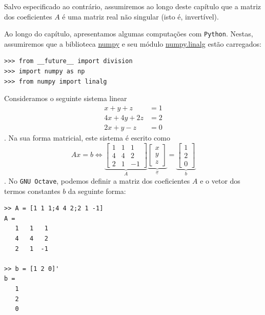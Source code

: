 Salvo especificado ao contrário, assumiremos ao longo deste capítulo que a matriz dos coeficientes $A$ é uma matriz real não singular (isto é, invertível).

\ifispython
Ao longo do capítulo, apresentamos algumas computações com \verb+Python+. Nestas, assumiremos que a biblioteca \href{http://www.numpy.org/}{numpy} e seu módulo \href{https://docs.scipy.org/doc/numpy/reference/routines.linalg.html}{numpy.linalg} estão carregados:
\begin{verbatim}
>>> from __future__ import division
>>> import numpy as np
>>> from numpy import linalg
\end{verbatim}
\fi

\begin{ex}
  Consideramos o seguinte sistema linear
  \begin{equation}
    \begin{split}
      x+y+z  &= 1\\
      4x+4y+2z&= 2\\
      2x+y-z &= 0
    \end{split}
  \end{equation}.
Na sua forma matricial, este sistema é escrito como
\begin{equation}
  Ax = b \Leftrightarrow
  \underbrace{\begin{bmatrix}
    1 & 1 & 1\\
    4 & 4 & 2\\
    2 & 1 & -1
  \end{bmatrix}}_{A}
\underbrace{
  \begin{bmatrix}
    x\\y\\z
  \end{bmatrix}
}_{\underline{x}} =
\underbrace{
  \begin{bmatrix}
    1\\2\\0
  \end{bmatrix}}_{b}
\end{equation}.
\ifisoctave
No \verb+GNU Octave+, podemos definir a matriz dos coeficientes $A$ e o vetor dos termos constantes $b$ da seguinte forma:
\begin{verbatim}
>> A = [1 1 1;4 4 2;2 1 -1]
A =
   1   1   1
   4   4   2
   2   1  -1

>> b = [1 2 0]'
b =
   1
   2
   0
\end{verbatim}
\fi


\end{ex}

